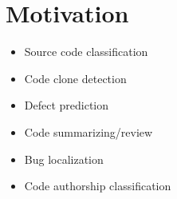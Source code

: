 \section{Motivation}\label{sec:mtiv}
\begin{frame}{}

\begin{itemize}
    \item Source code classification
    \item Code clone detection
    \item Defect prediction
    \item Code summarizing/review
    \item Bug localization
    \item Code authorship classification
\end{itemize}

\end{frame}